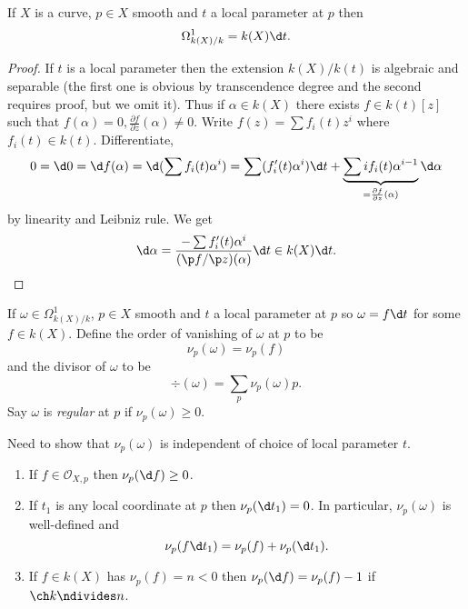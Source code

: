 \documentclass[a4paper]{article}
\begin{document}
\begin{lemma}
  If \(X\) is a curve, \(p \in X\) smooth and \(t\) a local parameter at \(p\) then
  \[
    \Omega^1_{k(X)/k} = k(X) \d t.
  \]
\end{lemma}

\begin{proof}
  If \(t\) is a local parameter then the extension \(k(X)/k(t)\) is algebraic and separable (the first one is obvious by transcendence degree and the second requires proof, but we omit it). Thus if \(\alpha \in k(X)\) there exists \(f \in k(t)[z]\) such that \(f(\alpha) = 0, \frac{\partial f}{\partial z}(\alpha) \neq 0\). Write \(f(z) = \sum f_i(t) z^i\) where \(f_i(t) \in k(t)\). Differentiate,
  \[
    0 = \d 0 = \d f(\alpha) = \d (\sum f_i(t) \alpha^i)
    = \sum (f_i'(t) \alpha^i) \d t + \underbrace{\sum i f_i(t) \alpha^{i - 1}}_{= \frac{\partial f}{\partial z}(\alpha)} \d \alpha
  \]
  by linearity and Leibniz rule. We get
  \[
    \d \alpha = \frac{- \sum f_i'(t) \alpha^i}{(\p f/\p z)(\alpha)} \d t \in k(X) \d t.
  \]
\end{proof}

\begin{definition}[regular]
  If \(\omega \in \Omega^1_{k(X)/k}\), \(p \in X\) smooth and \(t\) a local parameter at \(p\) so \(\omega = f \d t\) for some \(f \in k(X)\). Define the order of vanishing of \(\omega\) at \(p\) to be
  \[
    \nu_p(\omega) = \nu_p(f)
  \]
  and the divisor of \(\omega\) to be
  \[
    \div(\omega) = \sum_p \nu_p(\omega) p.
  \]
  Say \(\omega\) is \emph{regular} at \(p\) if \(\nu_p(\omega) \geq 0\).
\end{definition}
Need to show that \(\nu_p(\omega)\) is independent of choice of local parameter \(t\).

\begin{lemma}\leavevmode
  \begin{enumerate}
  \item If \(f \in \mathcal O_{X, p}\) then \(\nu_p(\d f) \geq 0\).
  \item If \(t_1\) is any local coordinate at \(p\) then \(\nu_p(\d t_1) = 0\). In particular, \(\nu_p(\omega)\) is well-defined and
    \[
      \nu_p(f \d t_1) = \nu_p(f) + \nu_p(\d t_1).
    \]
  \item If \(f \in k(X)\) has \(\nu_p(f) = n < 0\) then \(\nu_p(\d f) = \nu_p(f) - 1\) if \(\ch k \ndivides n\).
  \end{enumerate}
\end{lemma}
\end{document}
